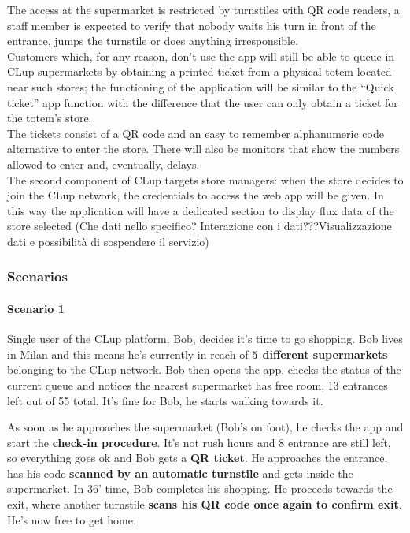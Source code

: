 The access at the supermarket is restricted by turnstiles with QR code readers, a staff member is expected to verify that nobody waits his turn in front of the entrance, jumps the turnstile or does anything irresponsible.\\
Customers which, for any reason, don’t use the app will still be able to queue in CLup supermarkets by obtaining a printed ticket from a physical totem located near such stores; the functioning of the application will be similar to the “Quick ticket” app function with the difference that the user can only obtain a ticket for the totem’s store. \\
The tickets consist of a QR code and an easy to remember alphanumeric code alternative to enter the store. There will also be monitors that show the numbers allowed to enter and, eventually, delays.\\
The second component of CLup targets store managers: when the store decides to join the CLup network, the credentials to access the web app will be given. In this way the application will have a dedicated section to display flux data of the store selected (Che dati nello specifico? Interazione con i dati???Visualizzazione dati e possibilità di sospendere il servizio)

\subsubsection{\sffamily \sffamily Scenarios}
\paragraph{Scenario 1}

Single user of the CLup platform, Bob, decides it's time to go shopping.
Bob lives in Milan and this means he's currently in reach of \textbf{5 different supermarkets} belonging to the CLup network. \newline
Bob then opens the app, checks the status of the current queue and notices the nearest supermarket has free room, 13 entrances left out of 55 total. It's fine for Bob, he starts walking towards it.

As soon as he approaches the supermarket (Bob's on foot), he checks the app and start the \textbf{check-in procedure}. It's not rush hours and 8 entrance are still left, so everything goes ok and Bob gets a \textbf{QR ticket}. He approaches the entrance, has his code \textbf{scanned by an automatic turnstile} and gets inside the supermarket.\newline
In 36' time, Bob completes his shopping. He proceeds towards the exit, where another turnstile \textbf{scans his QR code once again to confirm exit}. He's now free to get home.

